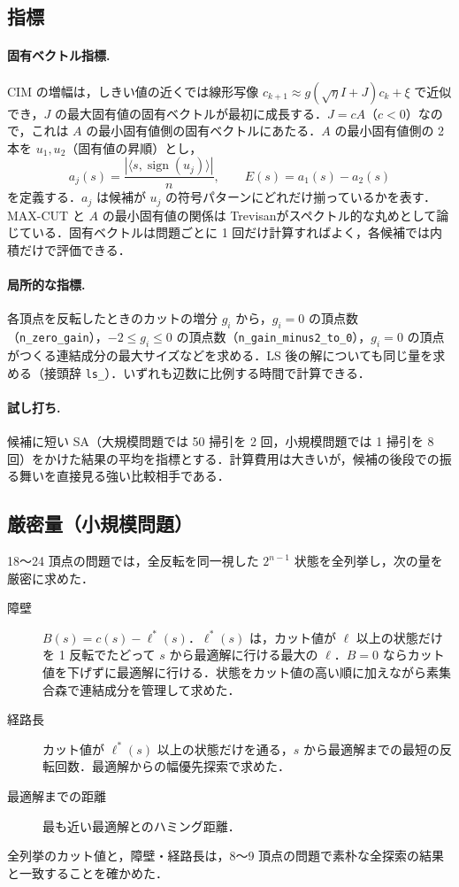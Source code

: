 \subsection{指標}

\paragraph{固有ベクトル指標.} CIM の増幅は，しきい値の近くでは線形写像 $c_{k+1}\approx g(\sqrt{\eta}I+J)c_k+\xi$ で近似でき，$J$ の最大固有値の固有ベクトルが最初に成長する．$J=cA$（$c<0$）なので，これは $A$ の最小固有値側の固有ベクトルにあたる．$A$ の最小固有値側の 2 本を $u_1,u_2$（固有値の昇順）とし，
\begin{equation}
  a_j(s) = \frac{\left|\langle s, \operatorname{sign}(u_j)\rangle\right|}{n},\qquad E(s) = a_1(s) - a_2(s)
\end{equation}
を定義する．$a_j$ は候補が $u_j$ の符号パターンにどれだけ揃っているかを表す．MAX-CUT と $A$ の最小固有値の関係は Trevisan\cite{trevisan2012}がスペクトル的な丸めとして論じている．固有ベクトルは問題ごとに 1 回だけ計算すればよく，各候補では内積だけで評価できる．

\paragraph{局所的な指標.} 各頂点を反転したときのカットの増分 $g_i$ から，$g_i=0$ の頂点数（\texttt{n\_zero\_gain}），$-2\le g_i\le 0$ の頂点数（\texttt{n\_gain\_minus2\_to\_0}），$g_i=0$ の頂点がつくる連結成分の最大サイズなどを求める．LS 後の解についても同じ量を求める（接頭辞 \texttt{ls\_}）．いずれも辺数に比例する時間で計算できる．

\paragraph{試し打ち.} 候補に短い SA（大規模問題では 50 掃引を 2 回，小規模問題では 1 掃引を 8 回）をかけた結果の平均を指標とする．計算費用は大きいが，候補の後段での振る舞いを直接見る強い比較相手である．

\subsection{厳密量（小規模問題）}

18〜24 頂点の問題では，全反転を同一視した $2^{n-1}$ 状態を全列挙し，次の量を厳密に求めた．
\begin{description}
  \item[障壁] $B(s)=c(s)-\ell^*(s)$．$\ell^*(s)$ は，カット値が $\ell$ 以上の状態だけを 1 反転でたどって $s$ から最適解に行ける最大の $\ell$．$B=0$ ならカット値を下げずに最適解に行ける．状態をカット値の高い順に加えながら素集合森で連結成分を管理して求めた．
  \item[経路長] カット値が $\ell^*(s)$ 以上の状態だけを通る，$s$ から最適解までの最短の反転回数．最適解からの幅優先探索で求めた．
  \item[最適解までの距離] 最も近い最適解とのハミング距離．
\end{description}
全列挙のカット値と，障壁・経路長は，8〜9 頂点の問題で素朴な全探索の結果と一致することを確かめた．
